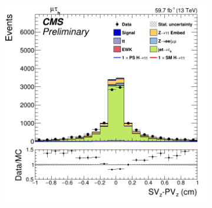 \begin{figure}
\begin{subfigure}[b]{0.33\linewidth}
    \caption{} 
    \vspace{0.5ex}
  \end{subfigure} 
    \begin{subfigure}[b]{0.33\linewidth}
    \centering
    \includegraphics[width=\linewidth]{Chapitre7/Images/TauFlightZfakes.png} 
    \caption{} 
    \vspace{0.5ex}
  \end{subfigure} 
\end{figure}



